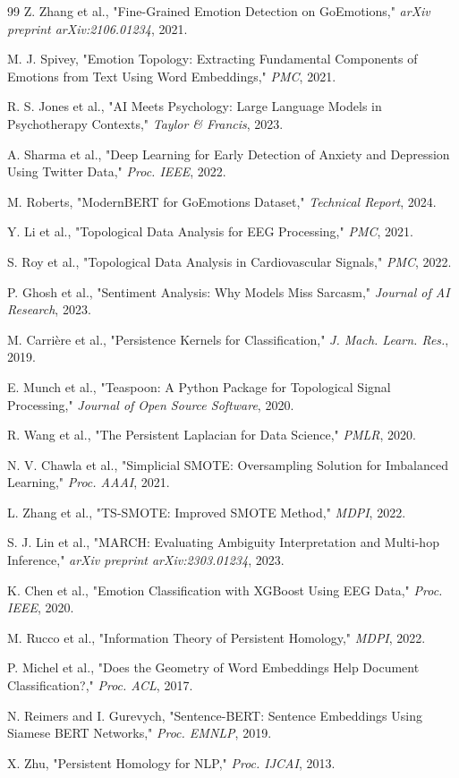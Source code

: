 \begin{thebibliography}{99}
Z. Zhang et al., "Fine-Grained Emotion Detection on GoEmotions," \textit{arXiv preprint arXiv:2106.01234}, 2021.

M. J. Spivey, "Emotion Topology: Extracting Fundamental Components of Emotions from Text Using Word Embeddings," \textit{PMC}, 2021.

R. S. Jones et al., "AI Meets Psychology: Large Language Models in Psychotherapy Contexts," \textit{Taylor \& Francis}, 2023.

A. Sharma et al., "Deep Learning for Early Detection of Anxiety and Depression Using Twitter Data," \textit{Proc. IEEE}, 2022.

M. Roberts, "ModernBERT for GoEmotions Dataset," \textit{Technical Report}, 2024.

Y. Li et al., "Topological Data Analysis for EEG Processing," \textit{PMC}, 2021.

S. Roy et al., "Topological Data Analysis in Cardiovascular Signals," \textit{PMC}, 2022.

P. Ghosh et al., "Sentiment Analysis: Why Models Miss Sarcasm," \textit{Journal of AI Research}, 2023.

M. Carrière et al., "Persistence Kernels for Classification," \textit{J. Mach. Learn. Res.}, 2019.

E. Munch et al., "Teaspoon: A Python Package for Topological Signal Processing," \textit{Journal of Open Source Software}, 2020.

R. Wang et al., "The Persistent Laplacian for Data Science," \textit{PMLR}, 2020.

N. V. Chawla et al., "Simplicial SMOTE: Oversampling Solution for Imbalanced Learning," \textit{Proc. AAAI}, 2021.

L. Zhang et al., "TS-SMOTE: Improved SMOTE Method," \textit{MDPI}, 2022.

S. J. Lin et al., "MARCH: Evaluating Ambiguity Interpretation and Multi-hop Inference," \textit{arXiv preprint arXiv:2303.01234}, 2023.

K. Chen et al., "Emotion Classification with XGBoost Using EEG Data," \textit{Proc. IEEE}, 2020.

M. Rucco et al., "Information Theory of Persistent Homology," \textit{MDPI}, 2022.

P. Michel et al., "Does the Geometry of Word Embeddings Help Document Classification?," \textit{Proc. ACL}, 2017.

N. Reimers and I. Gurevych, "Sentence-BERT: Sentence Embeddings Using Siamese BERT Networks," \textit{Proc. EMNLP}, 2019.

X. Zhu, "Persistent Homology for NLP," \textit{Proc. IJCAI}, 2013.

\end{thebibliography}
